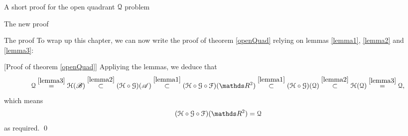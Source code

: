 \documentclass[11pt, a4paper, english, twoside, notitlepage, openright]{report}
\begin{document}
\begin{chapter}{A short proof for the open quadrant $\mathcal{Q}$ problem}
\begin{section}{The new proof}
\begin{subsection}{The proof}
To wrap up this chapter, we can now write the proof of theorem \ref{openQuad} relying on lemmas \ref{lemma1}, \ref{lemma2} and \ref{lemma3}:

\vspace{1mm}

[Proof of theorem \ref{openQuad}] Appliying the lemmas, we deduce that
$$
\Qu \overset{\ref{lemma3}}{=} \HH(\mathscr{B}) \overset{\ref{lemma2}}{\subset} (\HH \circ \GG)(\mathscr{A}) \overset{\ref{lemma1}}{\subset} (\HH \circ \GG \circ \FF)(\R^2) \overset{\ref{lemma1}}{\subset} (\HH \circ \GG)(\Qu) \overset{\ref{lemma2}}{\subset} \HH(\Qu) \overset{\ref{lemma3}}{=} \Qu,
$$
which means 
$$
(\HH \circ \GG \circ \FF)(\R^2) = \Qu
$$
as required.
\qed
\end{subsection}



\end{section}
\end{chapter}
\end{document}
